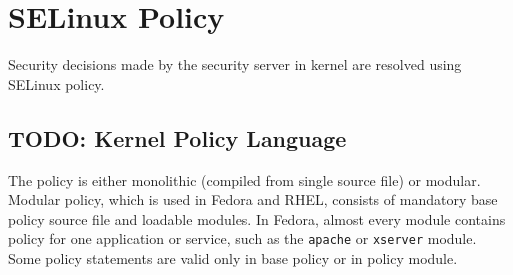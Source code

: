 \section{SELinux Policy}
\label{policy}

Security decisions made by the security server in kernel are resolved using
SELinux policy.

\subsection{TODO: Kernel Policy Language}

The policy is either monolithic (compiled from single source file) or modular.
Modular policy, which is used in Fedora and RHEL, consists of mandatory base
policy source file and loadable modules. In Fedora, almost every module contains
policy for one application or service, such as the \texttt{apache} or
\texttt{xserver} module. Some policy statements are valid only in base policy or
in policy module.

